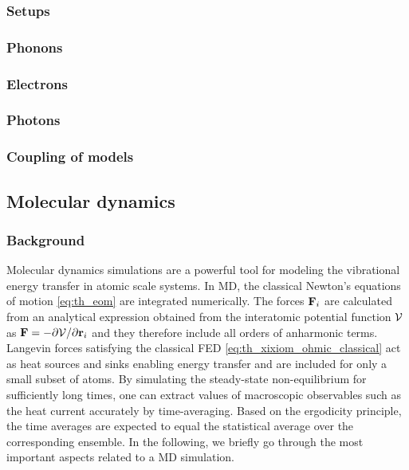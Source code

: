 \subsubsection{Setups}

\subsubsection{Phonons}

\subsubsection{Electrons}

\subsubsection{Photons}

\subsubsection{Coupling of models}

\subsection{Molecular dynamics}
\label{sec:methods_md}

\subsubsection{Background}

Molecular dynamics simulations are a powerful tool for modeling the vibrational energy transfer in atomic scale systems. In MD, the classical Newton's equations of motion \eqref{eq:th_eom}  are integrated numerically. The forces $\mathbf{F}_i$ are calculated from an analytical expression obtained from the interatomic potential function $\mathcal{V}$ as $\mathbf{F}=-\partial \mathcal{V}/\partial \mathbf{r}_i$ and they therefore include all orders of anharmonic terms. Langevin forces satisfying the classical FED \eqref{eq:th_xixiom_ohmic_classical} act as heat sources and sinks enabling energy transfer and are included for only a small subset of atoms.  By simulating the steady-state non-equilibrium for sufficiently long times, one can extract values of macroscopic observables such as the heat current accurately by time-averaging. Based on the ergodicity principle, the time averages are expected to equal the statistical average over the corresponding ensemble. In the following, we briefly go through the most important aspects related to a MD simulation.

